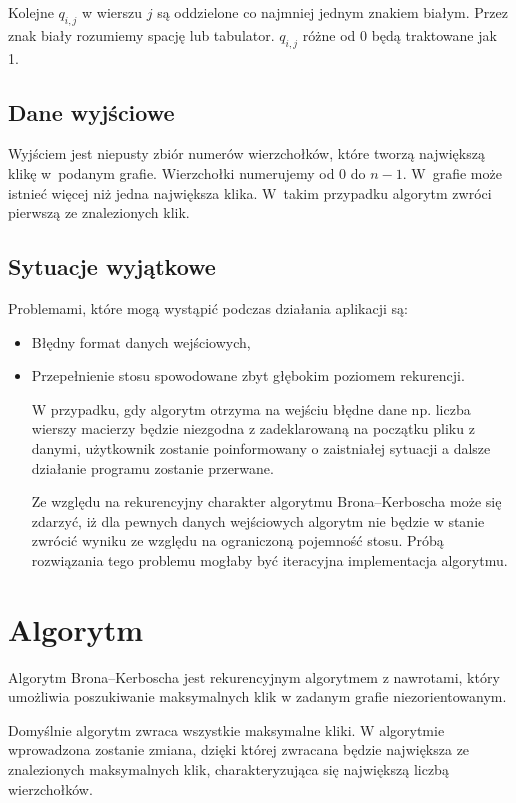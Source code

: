 \documentclass[12pt, a4paper]{article}
\begin{document}
Kolejne $q_{i,j}$ w wierszu $j$ są oddzielone co najmniej jednym znakiem białym. 
Przez znak biały rozumiemy spację lub tabulator. $q_{i,j}$ różne od 0 będą traktowane jak 1.
\subsection{Dane wyjściowe}
Wyjściem jest niepusty zbiór numerów wierzchołków, które tworzą największą klikę w~podanym grafie. 
Wierzchołki numerujemy od 0 do $n-1$. W~grafie może istnieć więcej niż jedna największa klika.
W~takim przypadku algorytm zwróci pierwszą ze znalezionych klik.
\subsection{Sytuacje wyjątkowe}
Problemami, które mogą wystąpić podczas działania aplikacji są:
\begin{itemize}
	\item Błędny format danych wejściowych,
	\item Przepełnienie stosu spowodowane zbyt głębokim poziomem rekurencji.

\bigskip
W przypadku, gdy algorytm otrzyma na wejściu błędne dane np. liczba wierszy macierzy będzie niezgodna z zadeklarowaną na początku pliku z danymi, użytkownik zostanie poinformowany o zaistniałej sytuacji a dalsze działanie programu zostanie przerwane.

\bigskip
Ze względu na rekurencyjny charakter algorytmu Brona--Kerboscha może się zdarzyć, iż dla pewnych danych wejściowych algorytm nie będzie w stanie zwrócić wyniku ze względu na ograniczoną pojemność stosu.
Próbą rozwiązania tego problemu mogłaby być iteracyjna implementacja algorytmu.

\end{itemize}
\section{Algorytm}
\label{bron_kerbosch}
Algorytm Brona--Kerboscha jest rekurencyjnym algorytmem z nawrotami, który umożliwia poszukiwanie maksymalnych klik w zadanym grafie niezorientowanym.

Domyślnie algorytm zwraca wszystkie maksymalne kliki. W algorytmie wprowadzona zostanie zmiana, dzięki której zwracana będzie największa ze znalezionych maksymalnych klik, charakteryzująca się największą liczbą wierzchołków.
\end{document}
